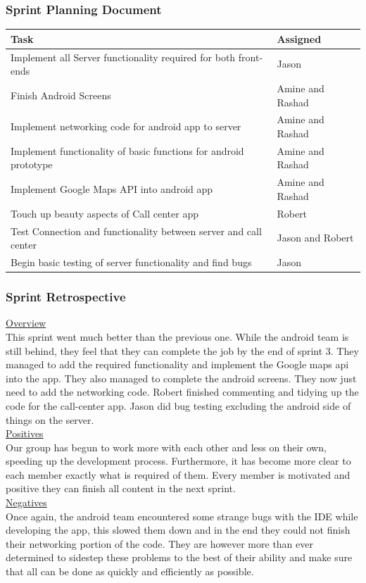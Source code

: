 \documentclass[a4paper,12pt]{article}
\begin{document}
\subsubsection{Sprint Planning Document}
\begin{tabular}{|p{9.5cm}|p{3.5cm}|}
\hline
Task & Assigned \\ \hline
Implement all Server functionality required for both front-ends & Jason \\ \hline
Finish Android Screens & Amine and Rashad \\ \hline
Implement networking code for android app to server & Amine and Rashad \\ \hline
Implement functionality of basic functions for android prototype & Amine and Rashad \\ \hline
Implement Google Maps API into android app & Amine and Rashad \\ \hline
Touch up beauty aspects of Call center app & Robert \\ \hline
Test Connection and functionality between server and call center & Jason and Robert \\ \hline
Begin basic testing of server functionality and find bugs & Jason \\ \hline

\end{tabular}

\subsubsection{Sprint Retrospective}
\underline{Overview}\\
This sprint went much better than the previous one. While the android team is still behind, they feel that they can complete the job by the end of sprint 3. They managed to add the required functionality and implement the Google maps api into the app. They also managed to complete the android screens. They now just need to add the networking code. Robert finished commenting and tidying up the code for the call-center app. Jason did bug testing excluding the android side of things on the server. \\
\underline{Positives}\\
Our group has begun to work more with each other and less on their own, speeding up the development process. Furthermore, it has become more clear to each member exactly what is required of them. Every member is motivated and positive they can finish all content in the next sprint.\\
\underline{Negatives}\\
Once again, the android team encountered some strange bugs with the IDE while developing the app, this slowed them down and in the end they could not finish their networking portion of the code. They are however more than ever determined to sidestep these problems to the best of their ability and make sure that all can be done as quickly and efficiently as possible.
\end{document}
